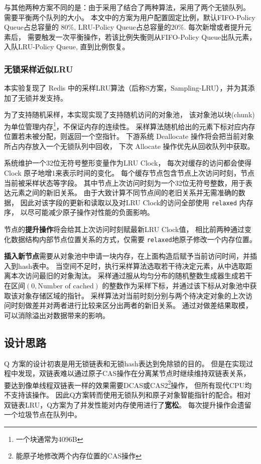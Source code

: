 与其他两种方案不同的是：由于采用了结合了两种算法，采用了两个无锁队列。
需要平衡两个队列的大小。
本文中的方案为用户配置固定比例，默认FIFO-Policy Queue占总容量的 $80\%$,
LRU-Policy Queue占总容量的$20\%$. 每次新增或者提升元素后，
需要触发一次平衡操作，若该比例失衡则从FIFO-Policy Queue出队元素，
入队LRU-Policy Queue, 直到比例恢复。

\subsubsection{无锁采样近似LRU}

本实验复现了 Redis 中的采样LRU算法（后称S方案，Sampling-LRU），并为其添加了无锁并发支持。

为了支持随机采样，本实现实现了支持随机访问的对象池，
该对象池以块(chunk)为单位管理内存\footnote{一个块通常为4096B}，不保证内存的连续性。
采样算法随机给出的元素下标对应内存位置若未被分配，则返回一个空指针。
下游系统 Deallocate 操作将会把当前对象所占内存放入一个无锁队列中回收，
下次 Allocate 操作优先从回收队列中获取。

系统维护一个32位无符号整形变量作为LRU Clock，
每次对缓存的访问都会使得Clock 原子地增1来表示时间的变化。
每个缓存节点包含节点上次访问时刻，节点当前被采样状态等字段。
其中节点上次访问时刻为一个32位无符号整数，用于表达元素之间的新旧关系。
由于大致计算不同节点间的老旧关系并无需准确的数据，
因此对该字段的更新和读取以及对LRU Clock的访问全部使用 \verb|relaxed| 内存序，
以尽可能减少原子操作对性能的负面影响。

节点的\textbf{提升操作}将会给其上次访问时刻赋最新LRU Clock值，
相比前两种通过变化数据结构内部节点位置关系的方式，仅需要 \verb|relaxed|地原子修改一个内存位置。

\textbf{插入新节点}需要从对象池中申请一块内存，在上面构造后赋予当前访问时间，并插入到hash表中。
当空间不足时，执行采样算法选取若干待决定元素，从中选取距离本次访问最旧的对象淘汰。
采样通过服从均匀分布的随机整数生成器生成若干在区间$\allowbreak (0, \mbox{Number of cached})$
的整数作为采样下标，并通过该下标从对象池中获取该对象存储区域的指针。
采样算法对当前时刻分别与两个待决定对象的上次访问时刻做差并对两者进行比较来区分出两者的新旧关系。
通过对做差结果取模，可以消除溢出对数据带来的影响。

\subsection{设计思路}

Q 方案的设计初衷是用无锁链表和无锁hash表达到免除锁的目的。
但是在实现过程中发现，双链表难以通过原子CAS操作在分离某节点时继续维持双链表关系，
要达到像单线程双链表一样的效果需要DCAS或CAS2\footnote{能原子地修改两个内存位置的CAS操作}操作，
但所有现代CPU均不支持该操作。
因此Q方案转而使用无锁队列和原子对象智能指针的配合。相对双链表LRU，Q方案为了并发性能对内存使用进行了\textbf{宽松}。
每次提升操作会遗留一个垃圾节点在队列中。

